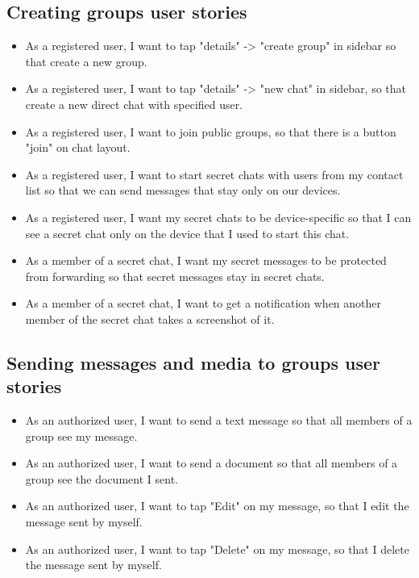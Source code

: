 \subsection{Creating groups user stories}\label{subsec:creating-groups-feature-user-stories}
\begin{itemize}
    \item As a registered user, I want to tap "details" -> "create group" in sidebar so that create a new group.
    \item As a registered user, I want to tap "details" -> "new chat" in sidebar, so that create a new direct chat with specified user.
    \item As a registered user, I want to join public groups, so that there is a button "join" on chat layout.
    \item As a registered user, I want to start secret chats with users from my contact list so that we can send messages that stay only on our devices.
    \item As a registered user, I want my secret chats to be device-specific so that I can see a secret chat only on the device that I used to start this chat.
    \item As a member of a secret chat, I want my secret messages to be protected from forwarding so that secret messages stay in secret chats.
    \item As a member of a secret chat, I want to get a notification when another member of the secret chat takes a screenshot of it.
\end{itemize}

\subsection{Sending messages and media to groups user stories}
\label{subsec:sending-messages-and-media-to-groups}
\begin{itemize}
    \item As an authorized user, I want to send a text message so that all members of a group see my message.
    \item As an authorized user, I want to send a document so that all members of a group see the document I sent.
    \item As an authorized user, I want to tap "Edit" on my message, so that I edit the message sent by myself.
    \item As an authorized user, I want to tap "Delete" on my message, so that I delete the message sent by myself.
\end{itemize}

